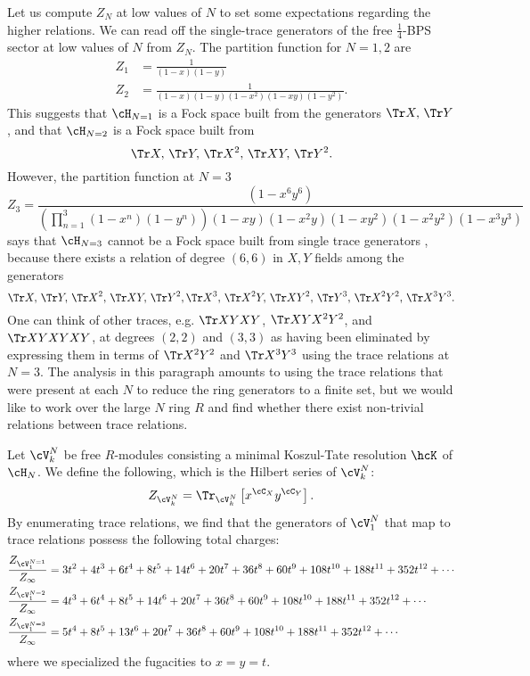 \documentclass[a4paper,12pt]{article}
\begin{document}
Let us compute $Z_N$ at low values of $N$ to set some expectations regarding the higher relations. We can read off the single-trace generators of the free $\frac{1}{4}$-BPS sector at low values of $N$ from $Z_N$. The partition function for $N=1,2$ are
\begin{align}
    Z_1 &= \frac{1}{(1-x)(1-y)} \nonumber \\
    Z_2 &= \frac{1}{(1-x)(1-y)(1-x^2)(1-x y)(1-y^2)}.
\end{align}
This suggests that $\cH_{N=1}$ is a Fock space built from the generators $\Tr X, \, \Tr Y$, and that $\cH_{N=2}$ is a Fock space built from
\begin{equation}
\Tr X,\, \Tr Y,\, \Tr X^2,\, \Tr X Y,\, \Tr Y^2.
\end{equation}
However, the partition function at $N=3$
\begin{equation}
Z_3 = \frac{(1-x^6 y^6)}{\left(\prod_{n=1}^3(1-x^n)(1-y^n)\right)(1-x y)(1-x^2 y)(1-x y^2)(1-x^2 y^2)(1-x^3 y^3)}
\end{equation}
says that $\cH_{N=3}$ cannot be a Fock space built from single trace generators \cite{Hanany:2007zz}, because there exists a relation of degree $(6,6)$ in $X,Y$ fields among the generators
\begin{equation}
\Tr X,\, \Tr Y,\, \Tr X^2,\, \Tr X Y,\, \Tr Y^2, \Tr X^3,\, \Tr X^2 Y,\, \Tr X Y^2,\, \Tr Y^3,\, \Tr X^2 Y^2,\, \Tr X^3 Y^3.
\end{equation}
One can think of other traces, e.g. $\Tr X Y X Y$, $\Tr X Y X^2 Y^2$, and $\Tr X Y X Y X Y$, at degrees $(2,2)$ and $(3,3)$ as having been eliminated by expressing them in terms of $\Tr X^2 Y^2$ and $\Tr X^3 Y^3$ using the trace relations at $N=3$. The analysis in this paragraph amounts to using the trace relations that were present at each $N$ to reduce the ring generators to a finite set, but we would like to work over the large $N$ ring $R$ and find whether there exist non-trivial relations between trace relations.

Let $\cV_k^N$ be free $R$-modules consisting a minimal Koszul-Tate resolution $\hcK$ of $\cH_N$. We define the following, which is the Hilbert series of $\cV_k^N$:
\begin{equation}
Z_{\cV_k^N} = \Tr_{\cV_k^N} \left[ x^{\cC_X} y^{\cC_Y} \right].
\end{equation}
By enumerating trace relations, we find that the generators of $\cV_1^N$ that map to trace relations possess the following total charges:
\begin{align}
    \frac{Z_{\cV_1^{N=1}}}{Z_\infty} &= 3 t^2 + 4 t^3 + 6 t^4 + 8 t^5 + 14 t^6 + 20 t^7 + 36 t^8 + 60 t^9 + 108 t^{10} + 188 t^{11} + 352 t^{12} + \cdots \nonumber \\
    \frac{Z_{\cV_1^{N=2}}}{Z_\infty} &= 4 t^3 + 6 t^4 + 8 t^5 + 14 t^6 + 20 t^7 + 36 t^8 + 60 t^9 + 108 t^{10} + 188 t^{11} + 352 t^{12} + \cdots \nonumber \\
    \frac{Z_{\cV_1^{N=3}}}{Z_\infty} &= 5 t^4 + 8 t^5 + 13 t^6 + 20 t^7 + 36 t^8 + 60 t^9 + 108 t^{10} + 188 t^{11} + 352 t^{12} + \cdots
\end{align}
where we specialized the fugacities to $x = y = t$.
\end{document}
